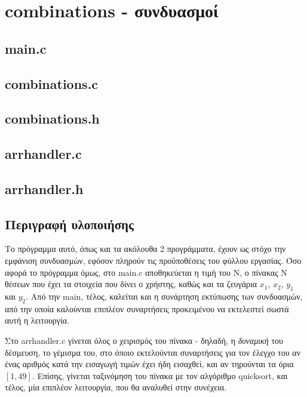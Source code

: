 \documentclass{article}
\begin{document}
\section{combinations - συνδυασμοί}

    \subsection{main.c}
        

    \subsection{combinations.c}
        

    \subsection{combinations.h}
        

    \subsection{arrhandler.c}
        

    \subsection{arrhandler.h}
        

    \subsection{Περιγραφή υλοποιήσης}

    Το πρόγραμμα αυτό, όπως και τα ακόλουθα 2 προγράμματα, έχουν ως στόχο την εμφάνιση
    συνδυασμών, εφόσον πληρούν τις προϋποθέσεις του φύλλου εργασίας. Όσο αφορά το πρόγραμμα όμως,
    στο main.c αποθηκεύεται η τιμή του Ν, ο πίνακας Ν θέσεων που έχει τα στοιχεία που δίνει ο χρήστης,
    καθώς και τα ζευγάρια $x_{1}$, $x_{2}$, $y_{1}$ και $y_{2}$. Από την main, τέλος, καλείται και η
    συνάρτηση εκτύπωσης των συνδυασμών, από την οποία καλούνται επιπλέον συναρτήσεις προκειμένου να εκτελεστεί
    σωστά αυτή η λειτουργία.  
    
    Στο arrhandler.c γίνεται όλος ο χειρισμός του πίνακα - δηλαδή, η \textit{δυναμική} του δέσμευση,
    το γέμισμα του, στο όποιο εκτελούνται συναρτήσεις για τον έλεγχο του αν ένας αριθμός κατά την εισαγωγή τιμών
    έχει ήδη εισαχθεί, και αν τηρούνται τα όρια $[1, 49]$. Επίσης, γίνεται ταξινόμηση του πίνακα με τον αλγόριθμο
    quicksort, και τέλος, μία επιπλέον λειτουργία, που θα αναλυθεί στην συνέχεια.  
\end{document}
